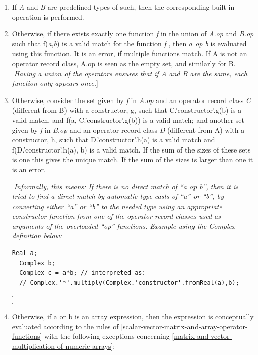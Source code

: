\documentclass[10pt,a4paper]{report}
\begin{document}
\begin{enumerate}
\item
  If \emph{A} and \emph{B} are predefined types of such, then the
  corresponding built-in operation is performed.
\item
  Otherwise, if there exists {exactly one} function \emph{f} in the
  union of \emph{A}.\emph{op} and \emph{B.op} such that
  f(\emph{a},\emph{b}) is a valid match for the function \emph{f} , then
  \emph{a op b} is evaluated using this function. It is an error, if
  multiple functions match. If A is not an operator record class, A.op
  is seen as the empty set, and similarly for B. {[}\emph{Having a union
  of the operators ensures that if A and B are the same, each function
  only appears once.}{]}
\item
  Otherwise, consider the set given by \emph{f} in \emph{A}.\emph{op}
  and an operator record class \emph{C} (different from B) with a
  constructor, g, such that C.'constructor'.g(b) is a valid match, and
  f(a, C.'constructor'.g(b)) is a valid match; and another set given by
  \emph{f} in \emph{B}.\emph{op} and an operator record class \emph{D}
  (different from A) with a constructor, h, such that
  D.'constructor'.h(a) is a valid match and f(D.'constructor'.h(a), b)
  is a valid match. If the sum of the sizes of these sets is one this
  gives the unique match. If the sum of the sizes is larger than one it
  is an error.
  
  {[}\emph{Informally, this means: If there is no direct match of ``a op
  b'', then it is tried to find a direct match by automatic type casts
  of ``a'' or ``b'', by converting either ``a'' or ``b'' to the needed
  type using an appropriate constructor function from one of the
  operator record classes used as arguments of the overloaded ``op''
  functions. Example using the Complex-definition below:}
  
\begin{lstlisting}[language=modelica]
   Real a;
  Complex b;
  Complex c = a*b; // interpreted as:
  // Complex.'*'.multiply(Complex.'constructor'.fromReal(a),b);
\end{lstlisting}
{]}
\item
  Otherwise, if a or b is an {array expression}, then the expression is
  conceptually evaluated according to the rules of \ref{scalar-vector-matrix-and-array-operator-functions} with the
  following exceptions concerning \ref{matrix-and-vector-multiplication-of-numeric-arrays}:


\end{enumerate}
\end{document}
